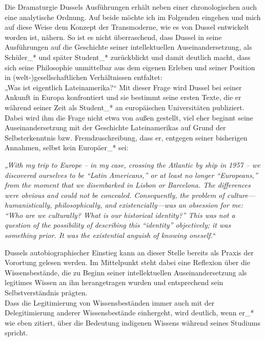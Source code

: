 Die Dramaturgie Dussels Ausführungen erhält neben einer chronologischen auch
eine analytische Ordnung. Auf beide möchte ich im Folgenden eingehen und mich
auf diese Weise dem Konzept der Transmoderne, wie es von Dussel entwickelt
worden ist, nähern. So ist es nicht überraschend, dass Dussel in seine
Ausführungen auf die Geschichte seiner intellektuellen Auseinandersetzung, als
Schüler\_* und später Student\_* zurückblickt und damit deutlich macht, dass sich
seine Philosophie unmittelbar aus dem eigenen Erleben und seiner Position in
(welt-)gesellschaftlichen Verhältnissen entfaltet:\footnotemark {}
\\

„Was ist eigentlich Lateinamerika?“ Mit dieser Frage wird Dussel bei seiner
Ankunft in Europa konfrontiert und sie bestimmt seine ersten Texte, die er
während seiner Zeit als Student\_* an europäischen Universitäten publiziert.
Dabei wird ihm die Frage nicht etwa von außen gestellt, viel eher beginnt seine
Auseinandersetzung mit der Geschichte Lateinamerikas auf Grund der
Selbsterkenntnis bzw. Fremdzuschreibung, dass er, entgegen seiner bisherigen
Annahmen, selbst kein Europäer\_* sei:

\begin{myenv}
    \textit{ „With my trip to Europe – in my case, crossing the Atlantic by ship
    in 1957 – we discovered ourselves to be “Latin Americans,” or at least no
    longer “Europeans,” from the moment that we disembarked in Lisbon or
    Barcelona. The differences were obvious and could not be concealed.
    Consequently, the problem of culture—humanistically, philosophically, and
    existencially—was an obsession for me: “Who are we culturally? What is our
    historical identity?” This was not a question of the possibility of
    describing this “identity” objectively; it was something prior. It was the
    existential anguish of knowing oneself.“\footnotemark {}}
\end{myenv}

Dussels autobiographischer Einstieg kann an dieser Stelle bereits als Praxis der
Vorortung gelesen werden. Im Mittelpunkt steht dabei eine Reflexion über die
Wissensbestände, die zu Beginn seiner intellektuellen Auseinandersetzung als
legitimes Wissen an ihn herangetragen wurden und entsprechend sein
Selbstverständnis prägten. \\
Dass die Legitimierung von Wissensbeständen immer
auch mit der Delegitimierung anderer Wissensbestände einhergeht, wird deutlich,
wenn er\_* wie eben zitiert, über die Bedeutung indigenen Wissens während seines
Studiums spricht.


